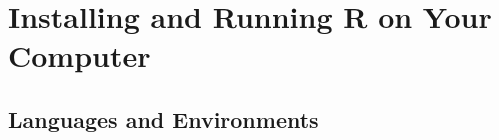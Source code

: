 
\section{Installing and Running R on Your Computer}

\subsection{Languages and Environments}
\label{sec:LangAndEnv}

